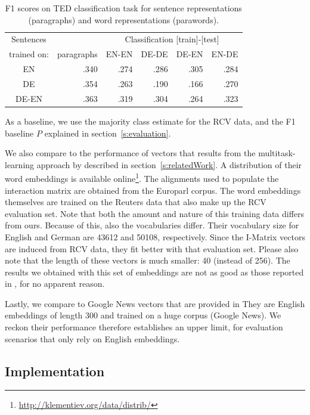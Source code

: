 \begin{table}[htb]
\center
\begin{tabular}{c | r|r r r r }
Sentences 		&		&	\multicolumn{4}{c}{Classification [train]-[test]}	\\
trained on: 		&paragraphs	&EN-EN	&DE-DE	&DE-EN	&EN-DE		\\\hline
EN			&.340		&.274		&.286		&.305		&.284		\\
DE			&.354		&.263		&.190		&.166		&.270		\\
DE-EN			&.363		&.319		&.304		&.264		&.323		\\
\end{tabular}
\caption{F1 scores on TED classification task for sentence representations (paragraphs) and word representations (parawords).}
\label{t:dbow_mono_bi}
\end{table}

As a baseline, we use the majority class estimate for the RCV data, and the F1 baseline $P$ explained in section~\ref{s:evaluation}. 

We also compare to the performance of vectors that results from the multitask-learning approach by \cite{klementiev2012inducing} described in section~\ref{s:relatedWork}. A distribution of their word embeddings is available online\footnote{\url{http://klementiev.org/data/distrib/}}. The alignments used to populate the interaction matrix are obtained from the Europarl corpus. The word embeddings themselves are trained on the Reuters data that also make up the RCV evaluation set. Note that both the amount and nature of this training data differs from ours. Because of this, also the vocabularies differ. Their vocabulary size for English and German are 43612 and 50108, respectively. Since the I-Matrix vectors are induced from RCV data, they fit better with that evaluation set. Please also note that the length of these vectors is much smaller: 40 (instead of 256). The results we obtained with this set of embeddings are not as good as those reported in \cite{klementiev2012inducing}, for no apparent reason.

Lastly, we compare to Google News vectors that are provided in \cite{mikolov2013efficient}
They are English embeddings of length 300 and trained on a huge corpus (Google News). We reckon their performance therefore establishes an upper limit, for evaluation scenarios that only rely on English embeddings.

\subsection{Implementation}


